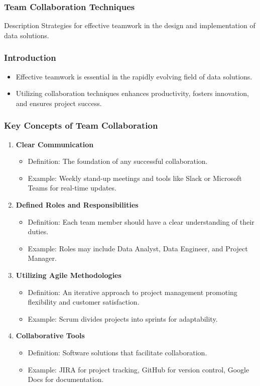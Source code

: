 \documentclass{beamer}
\begin{document}
\begin{frame}
    \frametitle{Team Collaboration Techniques}
    \begin{block}{Description}
        Strategies for effective teamwork in the design and implementation of data solutions.
    \end{block}
\end{frame}

\begin{frame}
    \frametitle{Introduction}
    \begin{itemize}
        \item Effective teamwork is essential in the rapidly evolving field of data solutions.
        \item Utilizing collaboration techniques enhances productivity, fosters innovation, and ensures project success.
    \end{itemize}
\end{frame}

\begin{frame}
    \frametitle{Key Concepts of Team Collaboration}
    \begin{enumerate}
        \item \textbf{Clear Communication}
            \begin{itemize}
                \item Definition: The foundation of any successful collaboration.
                \item Example: Weekly stand-up meetings and tools like Slack or Microsoft Teams for real-time updates.
            \end{itemize}
        \item \textbf{Defined Roles and Responsibilities}
            \begin{itemize}
                \item Definition: Each team member should have a clear understanding of their duties.
                \item Example: Roles may include Data Analyst, Data Engineer, and Project Manager.
            \end{itemize}
        \item \textbf{Utilizing Agile Methodologies}
            \begin{itemize}
                \item Definition: An iterative approach to project management promoting flexibility and customer satisfaction.
                \item Example: Scrum divides projects into sprints for adaptability.
            \end{itemize}
        \item \textbf{Collaborative Tools}
            \begin{itemize}
                \item Definition: Software solutions that facilitate collaboration.
                \item Example: JIRA for project tracking, GitHub for version control, Google Docs for documentation.
            \end{itemize}
    \end{enumerate}
\end{frame}
\end{document}

